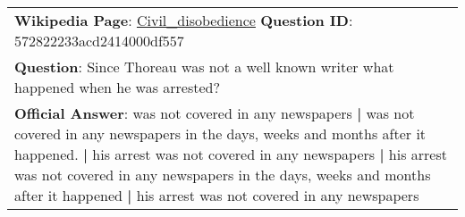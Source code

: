 \begin{figure*}[ht]
{\begin{tabular}{p{}}
            \textbf{Wikipedia Page}: \underline{Civil\_disobedience} \textbf{Question ID}: 572822233acd2414000df557                                                                                                                                                                                                                                                                                                                                                                                                                                                                                                                                                                                                                                                                                                                                                                                                                                                                                                                      \\
            \textbf{Question}: Since Thoreau was not a well known writer what happened when he was arrested?                                                                                                                                                                                                                                                                                                                                                                                                                                                                                                                                                                                                                                                                                                                                                                                                                                                                                                                             \\
            \textbf{Official Answer}: was not covered in any newspapers \textbf{|} was not covered in any newspapers in the days, weeks and months after it happened. \textbf{|} his arrest was not covered in any newspapers \textbf{|} his arrest was not covered in any newspapers in the days, weeks and months after it happened \textbf{|} his arrest was not covered in any newspapers                                                                                                                                                                                                                                                                                                                                                                                                                                                                                                                                                                                                                                            \\

\end{tabular}}
\end{figure*}
